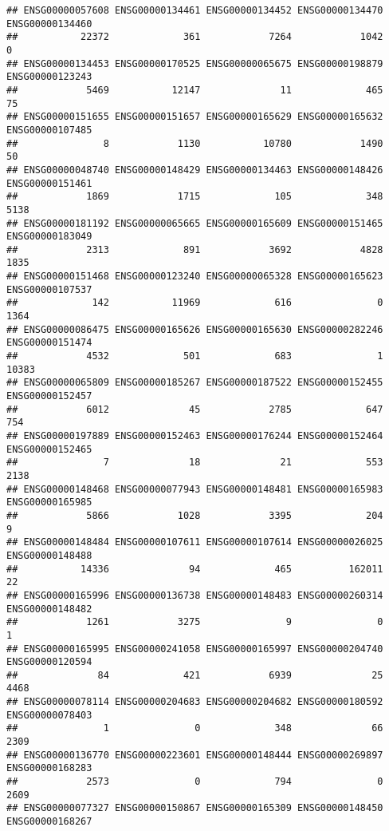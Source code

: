 \documentclass[
]{article}
\begin{document}
\begin{verbatim}
## ENSG00000057608 ENSG00000134461 ENSG00000134452 ENSG00000134470 ENSG00000134460 
##           22372             361            7264            1042               0 
## ENSG00000134453 ENSG00000170525 ENSG00000065675 ENSG00000198879 ENSG00000123243 
##            5469           12147              11             465              75 
## ENSG00000151655 ENSG00000151657 ENSG00000165629 ENSG00000165632 ENSG00000107485 
##               8            1130           10780            1490              50 
## ENSG00000048740 ENSG00000148429 ENSG00000134463 ENSG00000148426 ENSG00000151461 
##            1869            1715             105             348            5138 
## ENSG00000181192 ENSG00000065665 ENSG00000165609 ENSG00000151465 ENSG00000183049 
##            2313             891            3692            4828            1835 
## ENSG00000151468 ENSG00000123240 ENSG00000065328 ENSG00000165623 ENSG00000107537 
##             142           11969             616               0            1364 
## ENSG00000086475 ENSG00000165626 ENSG00000165630 ENSG00000282246 ENSG00000151474 
##            4532             501             683               1           10383 
## ENSG00000065809 ENSG00000185267 ENSG00000187522 ENSG00000152455 ENSG00000152457 
##            6012              45            2785             647             754 
## ENSG00000197889 ENSG00000152463 ENSG00000176244 ENSG00000152464 ENSG00000152465 
##               7              18              21             553            2138 
## ENSG00000148468 ENSG00000077943 ENSG00000148481 ENSG00000165983 ENSG00000165985 
##            5866            1028            3395             204               9 
## ENSG00000148484 ENSG00000107611 ENSG00000107614 ENSG00000026025 ENSG00000148488 
##           14336              94             465          162011              22 
## ENSG00000165996 ENSG00000136738 ENSG00000148483 ENSG00000260314 ENSG00000148482 
##            1261            3275               9               0               1 
## ENSG00000165995 ENSG00000241058 ENSG00000165997 ENSG00000204740 ENSG00000120594 
##              84             421            6939              25            4468 
## ENSG00000078114 ENSG00000204683 ENSG00000204682 ENSG00000180592 ENSG00000078403 
##               1               0             348              66            2309 
## ENSG00000136770 ENSG00000223601 ENSG00000148444 ENSG00000269897 ENSG00000168283 
##            2573               0             794               0            2609 
## ENSG00000077327 ENSG00000150867 ENSG00000165309 ENSG00000148450 ENSG00000168267 

\end{verbatim}
\end{document}
